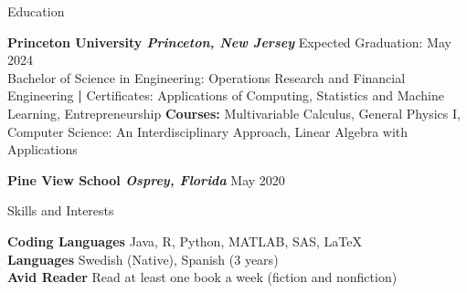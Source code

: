 \documentclass{resume} %
\begin{document}





\begin{rSection}{Education}

{\bf Princeton University \normalfont\em Princeton, New Jersey} \hfill Expected Graduation: May 2024
\\ 
Bachelor of Science in Engineering: Operations Research and Financial Engineering \textbf{|} Certificates: Applications of Computing, Statistics and Machine Learning, Entrepreneurship %
\newline \textbf{Courses:} Multivariable Calculus, General Physics I, Computer Science: An Interdisciplinary Approach, Linear Algebra with Applications

{\bf Pine View School \normalfont\em Osprey, Florida} \hfill May 2020

\end{rSection}



\begin{rSection}{Skills and Interests}

\textbf{Coding Languages} Java, R, Python, MATLAB, SAS, \LaTeX 
\\
\textbf{Languages} Swedish (Native), Spanish (3 years)
\\
\textbf{Avid Reader} Read at least one book a week (fiction and nonfiction)
\end{rSection}
\end{document}
